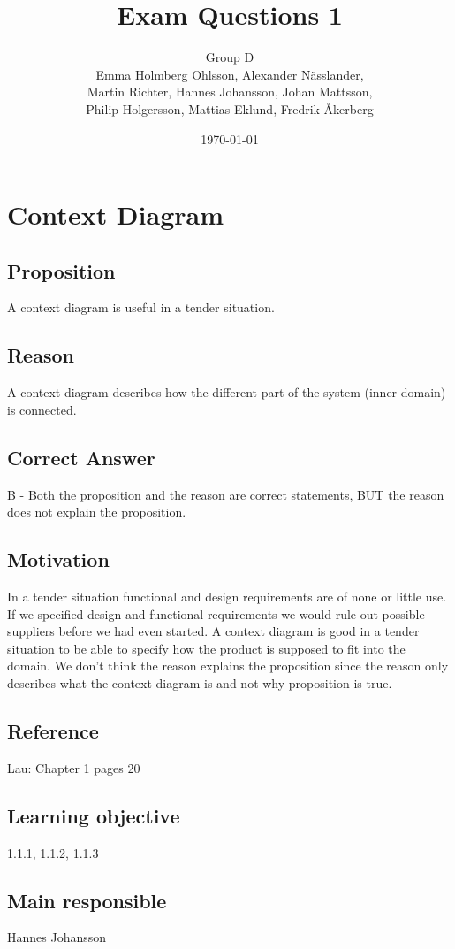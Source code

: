 \documentclass[a4paper]{article}
\title{Exam Questions 1}
\author{Group D\\ Emma Holmberg Ohlsson, Alexander Nässlander,\\Martin Richter, Hannes Johansson, Johan Mattsson,\\Philip Holgersson, Mattias Eklund, Fredrik Åkerberg}
\date{\today}
\begin{document}
	\maketitle
	\thispagestyle{empty}
	\setcounter{page}{0}
	\pagebreak

\section{Context Diagram}
\subsection*{Proposition}
A context diagram is useful in a tender situation.
\subsection*{Reason}
A context diagram describes how the different part of the system (inner domain) is connected.
\subsection*{Correct Answer}
B - Both the proposition and the reason are correct statements, BUT the reason does not explain the proposition.
\subsection*{Motivation}
In a tender situation functional and design requirements are of none or little use. If we specified design and functional requirements we would rule out possible suppliers before we had even started.
A context diagram is good in a tender situation to be able to specify how the product is supposed to fit into the domain.
We don't think the reason explains the proposition since the reason only describes what the context diagram is and not why proposition is true.
\subsection*{Reference}
Lau: Chapter 1 pages 20
\subsection*{Learning objective}
1.1.1, 1.1.2, 1.1.3
\subsection*{Main responsible}
Hannes Johansson
\end{document}

